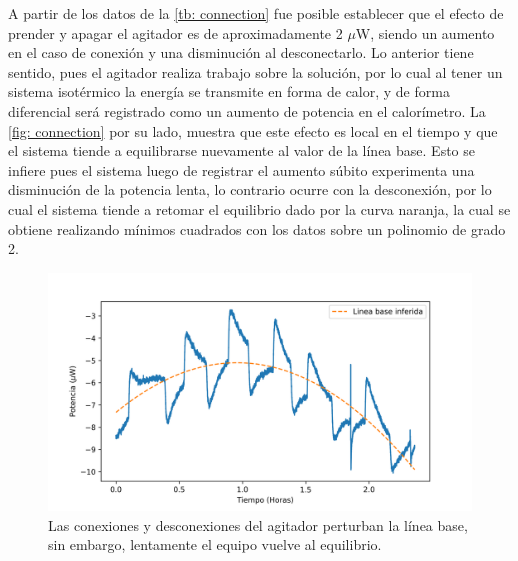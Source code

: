 	A partir de los datos de la \autoref{tb: connection} fue posible establecer que el efecto de prender y apagar el agitador es de aproximadamente 2 $\mu$W, siendo un aumento en el caso de conexión y una disminución al desconectarlo. Lo anterior tiene sentido, pues el agitador realiza trabajo sobre la solución, por lo cual al tener un sistema isotérmico la energía se transmite en forma de calor, y de forma diferencial será registrado como un aumento de potencia en el calorímetro. La \autoref{fig: connection} por su lado, muestra que este efecto es local en el tiempo y que el sistema tiende a equilibrarse nuevamente al valor de la línea base. Esto se infiere pues el sistema luego de registrar el aumento súbito experimenta una disminución de la potencia lenta, lo contrario ocurre con la desconexión, por lo cual el sistema tiende a retomar el equilibrio dado por la curva naranja, la cual se obtiene realizando mínimos cuadrados con los datos sobre un polinomio de grado 2.
	\begin{figure}[h]
		\centering
		\includegraphics[width=\linewidth]{../Data/Baselines/motor}
		\caption{Las conexiones y desconexiones del agitador perturban la línea base, sin embargo, lentamente el equipo vuelve al equilibrio.}
		\label{fig: connection}
	\end{figure}	